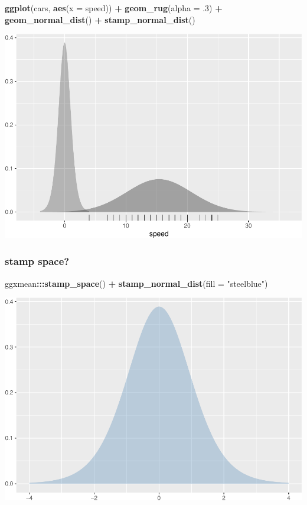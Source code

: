 \documentclass[12pt]{article}
\newenvironment{Shaded}{\begin{snugshade}}{\end{snugshade}}
\newcommand{\DataTypeTok}[1]{\textcolor[rgb]{0.13,0.29,0.53}{#1}}
\newcommand{\FloatTok}[1]{\textcolor[rgb]{0.00,0.00,0.81}{#1}}
\newcommand{\KeywordTok}[1]{\textcolor[rgb]{0.13,0.29,0.53}{\textbf{#1}}}
\newcommand{\NormalTok}[1]{#1}
\newcommand{\OperatorTok}[1]{\textcolor[rgb]{0.81,0.36,0.00}{\textbf{#1}}}
\newcommand{\StringTok}[1]{\textcolor[rgb]{0.31,0.60,0.02}{#1}}
\begin{document}
\begin{Shaded}
\begin{Highlighting}[]
\KeywordTok{ggplot}\NormalTok{(cars, }\KeywordTok{aes}\NormalTok{(}\DataTypeTok{x =}\NormalTok{ speed)) }\OperatorTok{+}
\StringTok{  }\KeywordTok{geom_rug}\NormalTok{(}\DataTypeTok{alpha =} \FloatTok{.3}\NormalTok{) }\OperatorTok{+}
\StringTok{  }\KeywordTok{geom_normal_dist}\NormalTok{() }\OperatorTok{+}\StringTok{ }
\StringTok{  }\KeywordTok{stamp_normal_dist}\NormalTok{()}
\end{Highlighting}
\end{Shaded}

\begin{center}\includegraphics[width=0.5\linewidth]{manuscript_files/figure-latex/unnamed-chunk-10-1} \end{center}

\hypertarget{stamp-space}{%
\subsubsection{stamp space?}\label{stamp-space}}

\begin{Shaded}
\begin{Highlighting}[]
\NormalTok{ggxmean}\OperatorTok{:::}\KeywordTok{stamp_space}\NormalTok{() }\OperatorTok{+}
\StringTok{  }\KeywordTok{stamp_normal_dist}\NormalTok{(}\DataTypeTok{fill =} \StringTok{"steelblue"}\NormalTok{)}
\end{Highlighting}
\end{Shaded}

\begin{center}\includegraphics[width=0.5\linewidth]{manuscript_files/figure-latex/unnamed-chunk-11-1} \end{center}
\end{document}
